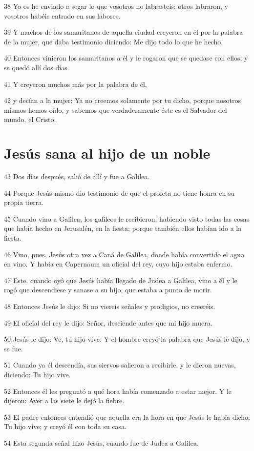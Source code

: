 \par 38 Yo os he enviado a segar lo que vosotros no labrasteis; otros labraron, y vosotros habéis entrado en sus labores.
\par 39 Y muchos de los samaritanos de aquella ciudad creyeron en él por la palabra de la mujer, que daba testimonio diciendo: Me dijo todo lo que he hecho.
\par 40 Entonces vinieron los samaritanos a él y le rogaron que se quedase con ellos; y se quedó allí dos días.
\par 41 Y creyeron muchos más por la palabra de él,
\par 42 y decían a la mujer: Ya no creemos solamente por tu dicho, porque nosotros mismos hemos oído, y sabemos que verdaderamente éste es el Salvador del mundo, el Cristo.

\section*{Jesús sana al hijo de un noble}

\par 43 Dos días después, salió de allí y fue a Galilea.
\par 44 Porque Jesús mismo dio testimonio de que el profeta no tiene honra en su propia tierra.
\par 45 Cuando vino a Galilea, los galileos le recibieron, habiendo visto todas las cosas que había hecho en Jerusalén, en la fiesta; porque también ellos habían ido a la fiesta.
\par 46 Vino, pues, Jesús otra vez a Caná de Galilea, donde había convertido el agua en vino. Y había en Capernaum un oficial del rey, cuyo hijo estaba enfermo.
\par 47 Este, cuando oyó que Jesús había llegado de Judea a Galilea, vino a él y le rogó que descendiese y sanase a su hijo, que estaba a punto de morir.
\par 48 Entonces Jesús le dijo: Si no viereis señales y prodigios, no creeréis.
\par 49 El oficial del rey le dijo: Señor, desciende antes que mi hijo muera.
\par 50 Jesús le dijo: Ve, tu hijo vive. Y el hombre creyó la palabra que Jesús le dijo, y se fue.
\par 51 Cuando ya él descendía, sus siervos salieron a recibirle, y le dieron nuevas, diciendo: Tu hijo vive.
\par 52 Entonces él les preguntó a qué hora había comenzado a estar mejor. Y le dijeron: Ayer a las siete le dejó la fiebre.
\par 53 El padre entonces entendió que aquella era la hora en que Jesús le había dicho: Tu hijo vive; y creyó él con toda su casa.
\par 54 Esta segunda señal hizo Jesús, cuando fue de Judea a Galilea.

